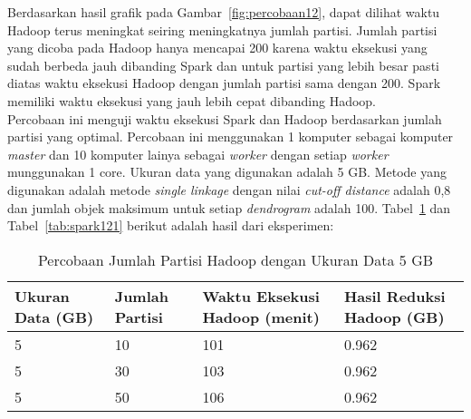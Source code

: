 Berdasarkan hasil grafik pada Gambar~\ref{fig:percobaan12}, dapat dilihat waktu Hadoop terus meningkat seiring meningkatnya jumlah partisi. Jumlah partisi yang dicoba pada Hadoop hanya mencapai 200 karena waktu eksekusi yang sudah berbeda jauh dibanding Spark dan untuk partisi yang lebih besar pasti diatas waktu eksekusi Hadoop dengan jumlah partisi sama dengan 200. Spark memiliki waktu eksekusi yang jauh lebih cepat dibanding Hadoop. \\















Percobaan ini menguji waktu eksekusi Spark dan Hadoop berdasarkan jumlah partisi yang optimal. Percobaan ini menggunakan 1 komputer sebagai komputer \textit{master} dan 10 komputer lainya sebagai \textit{worker} dengan setiap \textit{worker} munggunakan 1 core. Ukuran data yang digunakan adalah 5 GB. Metode yang digunakan adalah metode \textit{single linkage} dengan nilai \textit{cut-off distance} adalah 0,8 dan jumlah objek maksimum untuk setiap \textit{dendrogram} adalah 100. Tabel~\ref{tab:spark111} dan Tabel~\ref{tab:spark121} berikut adalah hasil dari eksperimen:





\begin{table}[H] 
	\centering 
	\caption{Percobaan Jumlah Partisi Hadoop dengan Ukuran Data 5 GB}
	\label{tab:spark111}
	\begin{tabular}{|p{3cm}|p{3cm}|p{4cm}|p{4cm}|}
\hline
Ukuran Data (GB) & Jumlah Partisi &  Waktu Eksekusi Hadoop (menit) & Hasil Reduksi Hadoop (GB)\\
\hline
5 & 10 & 101  & 0.962  \\
\hline
5 & 30 & 103  & 0.962  \\
\hline
5 & 50 & 106  & 0.962   \\
\hline


\hline

	\end{tabular} 
\end{table}






